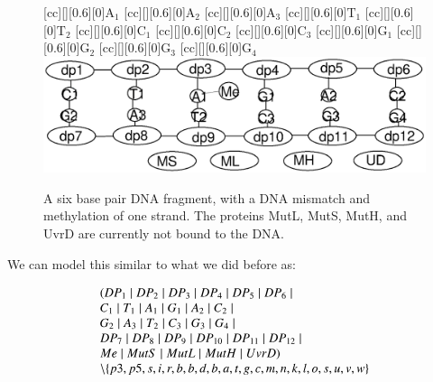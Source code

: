 \begin{figure}[h!]
[cc][][0.6][0]{${\mathrm{A_1}}$}
[cc][][0.6][0]{${\mathrm{A_2}}$}
[cc][][0.6][0]{${\mathrm{A_3}}$}
[cc][][0.6][0]{${\mathrm{T_1}}$}
[cc][][0.6][0]{${\mathrm{T_2}}$}
[cc][][0.6][0]{${\mathrm{C_1}}$}
[cc][][0.6][0]{${\mathrm{C_2}}$}
[cc][][0.6][0]{${\mathrm{C_3}}$}
[cc][][0.6][0]{${\mathrm{G_1}}$}
[cc][][0.6][0]{${\mathrm{G_2}}$}
[cc][][0.6][0]{${\mathrm{G_3}}$}
[cc][][0.6][0]{${\mathrm{G_4}}$}
  \centering
    \includegraphics[width=1.0\textwidth]{mmr/state1}
  \caption[A six base pair DNA fragment.]{A six base pair DNA fragment, with a DNA mismatch and methylation of one strand. The proteins MutL, MutS, MutH, and UvrD are currently not bound to the DNA.}
  \label{fig:state1}
\end{figure}

We can model this similar to what we did before as:

$$\begin{array}{l}
(DP_1 \; \vert \; DP_2 \; \vert \; DP_3 \; \vert \; DP_4 \; \vert \; DP_5 \; \vert \; DP_6 \; \vert \; \\
C_1 \; \vert \; T_1 \; \vert \; A_1 \; \vert \; G_1 \; \vert \; A_2 \; \vert \; C_2 \; \vert \; \\
G_2 \; \vert \; A_3 \; \vert \; T_2 \; \vert \; C_3 \; \vert \; G_3 \; \vert \; G_4 \; \vert \; \\
DP_7 \; \vert \; DP_8 \; \vert \; DP_9 \; \vert \; DP_{10} \; \vert \; DP_{11} \; \vert \; DP_{12} \; \vert \; \\
Me \; \vert \; MutS \; \vert \; MutL \; \vert \; MutH \; \vert \; UvrD) \\
\setminus\{p3, p5, s, i, r, b, b, d, b, a, t, g, c, m, n, k, l, o, s, u, v, w\} 
\end{array}$$ 

